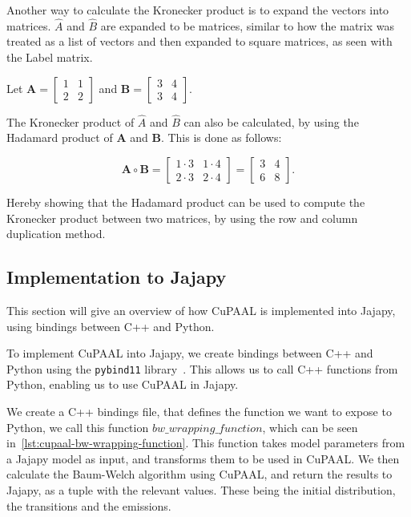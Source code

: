 Another way to calculate the Kronecker product is to expand the vectors into matrices.
$\hat{A}$ and $\hat{B}$ are expanded to be matrices, similar to how the matrix was treated as a list of vectors and then expanded to square matrices, as seen with the Label matrix.

Let $\mathbf{A} = \begin{bmatrix}
            1 & 1 \\
            2 & 2
      \end{bmatrix}$ and
$\mathbf{B} = \begin{bmatrix}
            3 & 4 \\
            3 & 4
      \end{bmatrix}$.

The Kronecker product of $\hat{A}$ and $\hat{B}$ can also be calculated, by using the Hadamard product of $\mathbf{A}$ and $\mathbf{B}$.
This is done as follows:

\begin{equation}
      \mathbf{A} \circ \mathbf{B} = \begin{bmatrix}
            1 \cdot 3 & 1 \cdot 4 \\
            2 \cdot 3 & 2 \cdot 4
      \end{bmatrix} = \begin{bmatrix}
            3 & 4 \\
            6 & 8
      \end{bmatrix}.
\end{equation}

Hereby showing that the Hadamard product can be used to compute the Kronecker product between two matrices, by using the row and column duplication method.

\subsection{Implementation to Jajapy}\label{subsec:implementation-to-jajapy}
This section will give an overview of how CuPAAL is implemented into Jajapy, using bindings between C++ and Python.

To implement CuPAAL into Jajapy, we create bindings between C++ and Python using the \texttt{pybind11} library~\cite{pybind11github}.
This allows us to call C++ functions from Python, enabling us to use CuPAAL in Jajapy.

We create a C++ bindings file, that defines the function we want to expose to Python, we call this function $bw\_wrapping\_function$, which can be seen in~\autoref{lst:cupaal-bw-wrapping-function}.
This function takes model parameters from a Jajapy model as input, and transforms them to be used in CuPAAL.
We then calculate the Baum-Welch algorithm using CuPAAL, and return the results to Jajapy, as a tuple with the relevant values.
These being the initial distribution, the transitions and the emissions.


